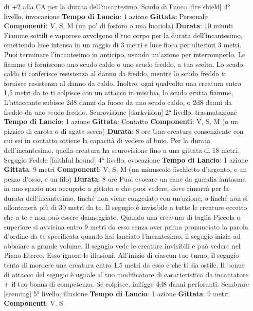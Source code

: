 \begin{multicols}{2}
di +2 alla CA per la durata dell’incantesimo.
Scudo di Fuoco
[fire shield]
4° livello, invocazione
\textbf{Tempo di Lancio}: 1 azione
\textbf{Gittata}: Personale
\textbf{Componenti}: V, S, M (un po’ di fosforo o una lucciola)
\textbf{Durata}: 10 minuti
Fiamme sottili e vaporose avvolgono il tuo corpo per la
durata dell’incantesimo, emettendo luce intensa in un
raggio di 3 metri e luce fioca per ulteriori 3 metri. Puoi
terminare l’incantesimo in anticipo, usando un’azione
per interromperlo.
Le fiamme ti forniscono uno scudo caldo o uno scudo
freddo, a tua scelta. Lo scudo caldo ti conferisce
resistenza al danno da freddo, mentre lo scudo freddo ti
fornisce resistenza al danno da caldo.
Inoltre, ogni qualvolta una creatura entro 1,5 metri da te
ti colpisce con un attacco in mischia, lo scudo erutta
fiamme. L’attaccante subisce 2d8 danni da fuoco da
uno scudo caldo, o 2d8 danni da freddo da uno scudo
freddo.
Scurovisione
[darkvision]
2° livello, trasmutazione
\textbf{Tempo di Lancio}: 1 azione
\textbf{Gittata}: Contatto
\textbf{Componenti}: V, S, M (o un pizzico di carota o di agata
secca)
\textbf{Durata}: 8 ore
Una creatura consenziente con cui sei in contatto
ottiene la capacità di vedere al buio. Per la durata
dell’incantesimo, quella creatura ha scurovisione fino a
una gittata di 18 metri.
Segugio Fedele
[faithful hound]
4° livello, evocazione
\textbf{Tempo di Lancio}: 1 azione
\textbf{Gittata}: 9 metri
\textbf{Componenti}: V, S, M (un minuscolo fischietto
d’argento, e un pezzo d’osso, e un filo)
\textbf{Durata}: 8 ore
Puoi evocare un cane da guardia fantasma in uno
spazio non occupato a gittata e che puoi vedere, dove
rimarrà per la durata dell’incantesimo, finché non viene
congedato con un’azione, o finché non si allontanerà
più di 30 metri da te.
Il segugio è invisibile a tutte le creature eccetto che a te
e non può essere danneggiato. Quando una creatura di
taglia Piccola o superiore si avvicina entro 9 metri da
esso senza aver prima pronunciato la parola d’ordine
da te specificata quando hai lanciato l’incantesimo, il
segugio inizia ad abbaiare a grande volume. Il segugio
vede le creature invisibili e può vedere nel Piano
Etereo. Esso ignora le illusioni.
All’inizio di ciascun tuo turno, il segugio tenta di
mordere una creatura entro 1,5 metri da esso e che ti
sia ostile. Il bonus di attacco del segugio è uguale al tuo
modificatore di caratteristica da incantatore + il tuo
bonus di competenza. Se colpisce, infligge 4d8 danni
perforanti.
Sembrare
[seeming]
5° livello, illusione
\textbf{Tempo di Lancio}: 1 azione
\textbf{Gittata}: 9 metri
\textbf{Componenti}: V, S

\end{multicols}
